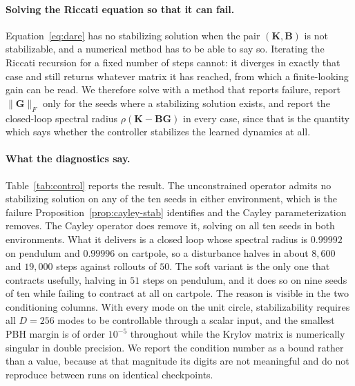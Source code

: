 \documentclass[10pt]{article} %
\newcommand{\K}{\mathbf{K}}
\newcommand{\B}{\mathbf{B}}
\begin{document}
\paragraph{Solving the Riccati equation so that it can fail.}
Equation~\ref{eq:dare} has no stabilizing solution when the pair $(\K, \B)$ is not stabilizable, and a numerical method has to be able to say so. Iterating the Riccati recursion for a fixed number of steps cannot: it diverges in exactly that case and still returns whatever matrix it has reached, from which a finite-looking gain can be read. We therefore solve with a method that reports failure, report $\|\mathbf{G}\|_F$ only for the seeds where a stabilizing solution exists, and report the closed-loop spectral radius $\rho(\K - \B\mathbf{G})$ in every case, since that is the quantity which says whether the controller stabilizes the learned dynamics at all.



\paragraph{What the diagnostics say.}
Table~\ref{tab:control} reports the result. The unconstrained operator admits no stabilizing solution on any of the ten seeds in either environment, which is the failure Proposition~\ref{prop:cayley-stab} identifies and the Cayley parameterization removes. The Cayley operator does remove it, solving on all ten seeds in both environments. What it delivers is a closed loop whose spectral radius is $0.99992$ on pendulum and $0.99996$ on cartpole, so a disturbance halves in about $8{,}600$ and $19{,}000$ steps against rollouts of $50$. The soft variant is the only one that contracts usefully, halving in $51$ steps on pendulum, and it does so on nine seeds of ten while failing to contract at all on cartpole. The reason is visible in the two conditioning columns. With every mode on the unit circle, stabilizability requires all $D{=}256$ modes to be controllable through a scalar input, and the smallest PBH margin is of order $10^{-5}$ throughout while the Krylov matrix is numerically singular in double precision. We report the condition number as a bound rather than a value, because at that magnitude its digits are not meaningful and do not reproduce between runs on identical checkpoints.

\end{document}
